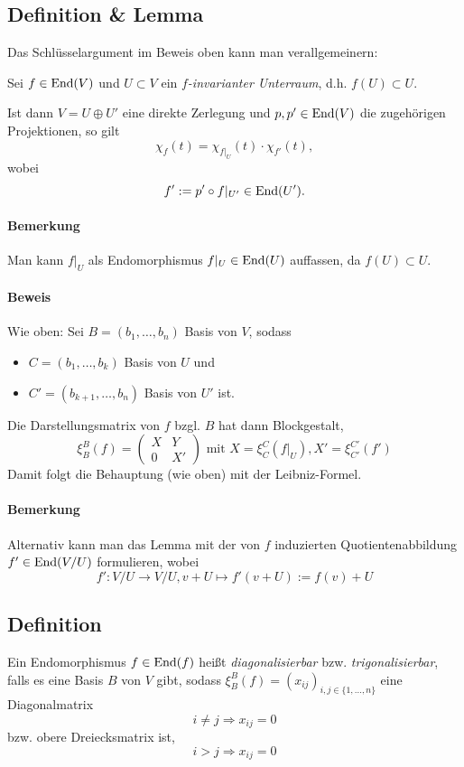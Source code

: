 \subsection{Definition \& Lemma}
	Das Schlüsselargument im Beweis oben kann man verallgemeinern:
	
	Sei $ f\in \operatorname{End}(V) $ und $ U\subset V $ ein \emph{$ f $-invarianter Unterraum}, d.h. $ f(U)\subset U $. 
	
	Ist dann $ V=U\oplus U' $ eine direkte Zerlegung und $ p,p'\in \operatorname{End}(V) $ die zugehörigen Projektionen, so gilt
		\[ \chi_f(t)=\chi_{f|_U}(t)\cdot \chi_{f'}(t), \]
	wobei
		\[ f':= p'\circ f|_{U'}\in \operatorname{End}(U'). \]

\paragraph{Bemerkung}
	Man kann $ f|_U $ als Endomorphismus $ f|_U\in \operatorname{End}(U) $ auffassen, da $ f(U)\subset U $.
\paragraph{Beweis}
	Wie oben: Sei $ B=(b_1,\dots,b_n) $ Basis von $ V $, sodass
		\begin{itemize}
			\item $ C=(b_1,\dots,b_k) $ Basis von $ U $ und
			\item $ C'=(b_{k+1},\dots,b_n) $ Basis von $ U' $ ist.
		\end{itemize}
	Die Darstellungsmatrix von $ f $ bzgl. $ B $ hat dann Blockgestalt,
		\[ \xi_B^B(f) =
			\begin{pmatrix}
				X&Y\\0&X'
			\end{pmatrix}
		\text{ mit } X=\xi_C^C(f|_U), X' = \xi_{C'}^{C'}(f') \]
	Damit folgt die Behauptung (wie oben) mit der Leibniz-Formel.
\paragraph{Bemerkung}
	Alternativ kann man das Lemma mit der von $ f $ induzierten Quotientenabbildung $ f'\in \operatorname{End}(V/U) $ formulieren, wobei
		\[ f':V/U\to V/U, v+U\mapsto f'(v+U) := f(v)+U \]
\subsection{Definition}
	Ein Endomorphismus $ f\in\operatorname{End}(f) $ heißt \emph{diagonalisierbar} bzw. \emph{trigonalisierbar}, falls es eine Basis $ B $ von $ V $ gibt, sodass $ \xi_B^B(f)=(x_{ij})_{i,j\in\{1,\dots,n\}} $ eine Diagonalmatrix 
		\[ i\neq j\Rightarrow x_{ij} = 0 \]
	bzw. obere Dreiecksmatrix ist,
		\[ i>j \Rightarrow x_{ij} = 0 \]
